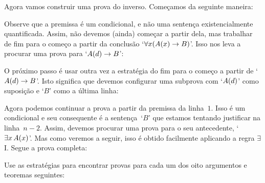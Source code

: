 Agora vamos construir uma prova do inverso. Começamos da seguinte maneira:
\begin{fitchproof}
	\ellipsesline
\end{fitchproof}
Observe que a premissa é um condicional, e não uma sentença  existencialmente quantificada. Assim, não devemos (ainda) começar a partir  dela,  mas trabalhar de fim para o começo a partir da conclusão `$\forall x(\mathord{A}(x) \rightarrow B)$'. Isso nos leva a procurar uma prova para `$\mathord{A}(d) \rightarrow B$':
\begin{fitchproof}
	\ellipsesline
\end{fitchproof}
O próximo passo é usar outra vez a estratégia do fim para o começo a partir de  `$\mathord{A}(d) \rightarrow B$'.  Isto significa que devemos configurar uma subprova  com  `$\mathord{A}(d)$' como suposição  e `$B$' como a última linha:  
 
\begin{fitchproof}
	\open
	\ellipsesline
	\close
\end{fitchproof}
Agora podemos continuar a prova a partir da premissa da linha~$1$. Isso é um condicional e seu consequente é a sentença~`$B$' que estamos tentando justificar na linha~$n-2$. Assim, devemos procurar uma prova para o seu antecedente, `$\exists x\,\mathord{A}(x)$'. Mas  como veremos a seguir, isso é obtido  facilmente aplicando a regra  $\exists$I.   Segue a prova completa:\begin{fitchproof}
	\open
	\close
\end{fitchproof}

\practiceproblems

\problempart
Use as estratégias  para encontrar provas para cada um dos oito argumentos e teoremas seguintes:
 

